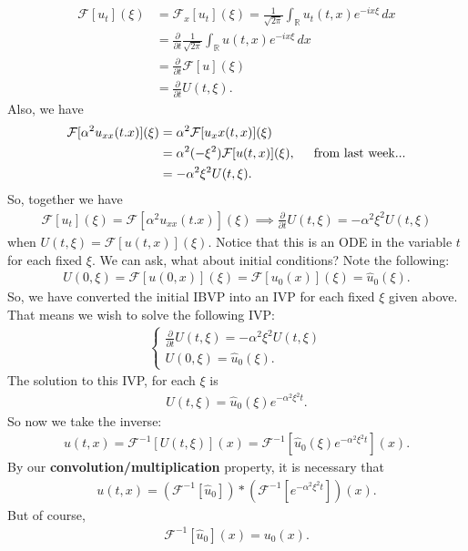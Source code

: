 \documentclass{book}
\theoremstyle{definition}
\newcommand{\p}{\partial}
\newcommand{\R}{\mathbb{R}}
\newcommand{\F}{\mathcal{F}}
\newcommand{\al}{\alpha}
\newcommand{\f}[2]{\frac{#1}{#2}}
\newcommand{\lp}{\left(}
\newcommand{\rp}{\right)}
\newcommand{\lb}{\left[}
\newcommand{\rb}{\right]}
\begin{document}
\begin{align*}
\F[u_t](\xi) &= \F_x[u_t](\xi) = \f{1}{\sqrt{2\pi}}\int_\R u_t(t,x) e^{-i x \xi}\,dx\\
&= \f{\p}{\p t}\f{1}{\sqrt{2\pi}}\int_\R u(t,x)e^{-ix\xi}\,dx\\
&= \f{\p}{\p t}\F[u](\xi)\\
&= \f{\p}{\p t}U(t,\xi).
\end{align*}
Also, we have
\begin{align*}
\F[\alpha^2 u_{xx}(t.x)](\xi) &= \alpha^2 \F[u_xx(t,x)](\xi)\\
&= \alpha^2(-\xi^2)\F[u(t,x)](\xi), \hspace{0.5cm}\text{from last week...}\\
&= -\al^2\xi^2 U(t,\xi).
\end{align*}
So, together we have
\begin{align*}
\F[u_t](\xi) = \F[\alpha^2 u_{xx}(t.x)](\xi) \implies \f{\p}{\p t}U(t,\xi) = -\al^2\xi^2 U(t,\xi)
\end{align*}
when $U(t,\xi) = \F[u(t,x)](\xi)$. Notice that this is an ODE in the variable $t$ for each fixed $\xi$. We can ask, what about initial conditions? Note the following:
\begin{align*}
U(0,\xi) = \F[u(0,x)](\xi) = \F[u_0(x)](\xi) = \hat{u}_0(\xi).
\end{align*}
So, we have converted the initial IBVP into an IVP for each fixed $\xi$ given above. That means we wish to solve the following IVP:
\begin{align}
\begin{cases}
\f{\p}{\p t}U(t,\xi) = -\al^2\xi^2 U(t,\xi) \\
U(0,\xi) = \hat{u}_0(\xi).
\end{cases}
\end{align}
The solution to this IVP, for each $\xi$ is
\begin{align*}
U(t,\xi) = \hat{u}_0(\xi)e^{-\al^2 \xi^2 t}.
\end{align*}
So now we take the inverse:
\begin{align*}
u(t,x) = \F^{-1}[U(t,\xi)](x) = \F^{-1}\lb \hat{u}_0(\xi)e^{-\al^2 \xi^2 t} \rb(x).
\end{align*}
By our \textbf{convolution/multiplication} property, it is necessary that 
\begin{align*}
u(t,x) = \lp \F^{-1}[\hat{u}_0] \rp \ast \lp \F^{-1}\lb e^{-\al^2\xi^2 t} \rb \rp(x).
\end{align*}
But of course,
\begin{align*}
\F^{-1}[\hat{u}_0](x) = u_0(x).
\end{align*}
\end{document}
